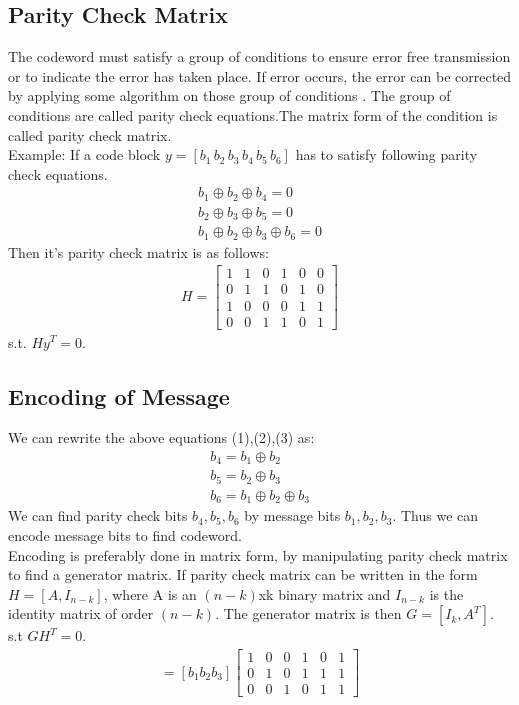 \subsection{Parity Check Matrix}

The codeword must satisfy a group of conditions to ensure error free transmission or to indicate the error has taken place. If error occurs, the error can be corrected by applying some algorithm on those group of conditions . The group of conditions are called parity check equations.The matrix form of the condition is called parity check matrix. \\
Example\cite{9}: If a code block $y=[b_1\, b_2\,b_3\, b_4\, b_5\, b_6]$ has to satisfy following parity check equations. 
\begin{align}
b_1 \oplus b_2 \oplus b_4 =0 \\
 b_2 \oplus b_3 \oplus b_5 =0 \\
b_1 \oplus b_2 \oplus b_3 \oplus b_6 =0 
\end{align}  
Then it's parity check matrix is as follows:
\begin{align}
 H= \left[ \begin{array}{cccccc}
1 & 1 & 0 & 1 & 0 & 0\\
0 & 1 & 1 & 0 & 1 & 0\\
1 & 0 & 0 & 0 & 1 & 1\\
0 & 0 & 1 & 1 & 0 & 1  
\end{array} \right]  
\end{align} 
s.t. $Hy^T=0$.

\subsection{Encoding of Message}
We can rewrite the above equations (1),(2),(3) as:
\begin{align}
b_4 = b_1 \oplus b_2 \\
b_5 = b_2 \oplus b_3 \\
b_6 = b_1 \oplus b_2 \oplus b_3  
\end{align}  
We can find parity check bits $b_4,b_5,b_6$ by message bits $b_1,b_2,b_3$.
Thus we can encode message bits to find codeword. \\
Encoding is preferably done in matrix form, by manipulating parity check matrix to find a generator matrix.
If parity check matrix can be written in the form
$H = [A, I_{n- k} ]$,
where A is an $(n-k)$xk binary matrix and $I_{n-k}$ is the identity matrix of order
$(n-k)$. The generator matrix is then
$G = [I_k , A^T ]$.
s.t $GH^T = 0$. \\
\begin{align}
[b_1 b_2 ... b_6]=[b_1 b_2 b_3] \left[ \begin{array}{cccccc}
1 & 0 & 0 & 1 & 0 & 1\\
0 & 1 & 0 & 1 & 1 & 1\\
0 & 0 & 1 & 0 & 1 & 1  
\end{array} \right]
\end{align}
 

